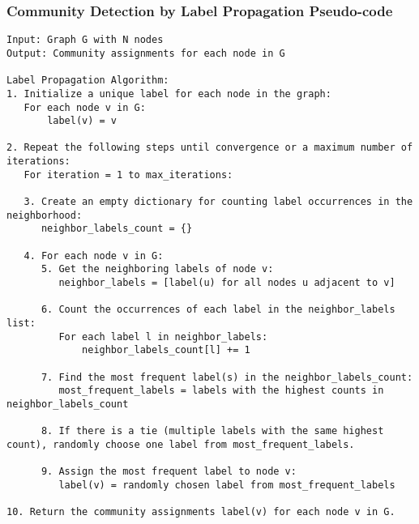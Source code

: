 \begin{frame}[fragile]\frametitle{Community Detection by Label Propagation Pseudo-code}

\begin{lstlisting}[basicstyle=\tiny]
Input: Graph G with N nodes
Output: Community assignments for each node in G

Label Propagation Algorithm:
1. Initialize a unique label for each node in the graph:
   For each node v in G:
       label(v) = v

2. Repeat the following steps until convergence or a maximum number of iterations:
   For iteration = 1 to max_iterations:

   3. Create an empty dictionary for counting label occurrences in the neighborhood:
      neighbor_labels_count = {}

   4. For each node v in G:
      5. Get the neighboring labels of node v:
         neighbor_labels = [label(u) for all nodes u adjacent to v]

      6. Count the occurrences of each label in the neighbor_labels list:
         For each label l in neighbor_labels:
             neighbor_labels_count[l] += 1

      7. Find the most frequent label(s) in the neighbor_labels_count:
         most_frequent_labels = labels with the highest counts in neighbor_labels_count

      8. If there is a tie (multiple labels with the same highest count), randomly choose one label from most_frequent_labels.

      9. Assign the most frequent label to node v:
         label(v) = randomly chosen label from most_frequent_labels

10. Return the community assignments label(v) for each node v in G.
\end{lstlisting}

\end{frame}

